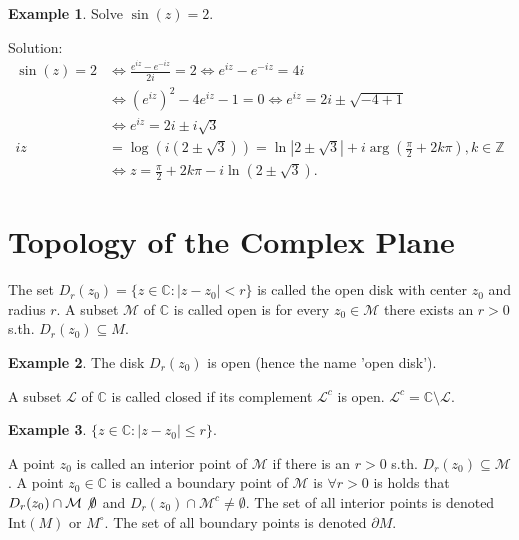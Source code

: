 \documentclass[12pt, a4paper]{article}
\theoremstyle{plain}
\theoremstyle{definition}
\newtheorem{example}{Example} %
\begin{document}
			\begin{example}
				Solve $\sin(z) = 2$.

				Solution:
				\begin{align*}
					\sin(z) = 2 &\iff \frac{e^{iz}-e^{-iz}}{2i}=2 \iff e^{iz}-e^{-iz} = 4i\\ &\iff
					(e^{iz})^2-4e^{iz}-1=0\iff e^{iz} = 2i\pm\sqrt{-4+1}\\ &\iff
					e^{iz} = 2i\pm i\sqrt{3}\\
					iz &= \log(i(2\pm\sqrt{3})) = \ln|2\pm\sqrt{3}|+i\arg(\frac{\pi}{2}+2k\pi),k\in \mathbb{Z}\\ &\iff
					z = \frac{\pi}{2} + 2k\pi - i\ln(2\pm\sqrt{3}).
				\end{align*}
			\end{example}
	\section{Topology of the Complex Plane} %
	\label{sec:topology_of_the_complex_plane}
		The set $D_r(z_0)= \{z\in \mathbb{C}: |z-z_0|<r\}$ is called the open disk with center $z_0$ and radius $r$. A subset $\mathcal{M}$ of $\mathbb{C}$ is called open is for every $z_0\in \mathcal{M}$ there exists an $r>0$ s.th. $D_r(z_0)\subseteq M$.

		\begin{example}
			The disk $D_r(z_0)$ is open (hence the name 'open disk').
		\end{example}

		A subset $\mathcal{L}$ of $\mathbb{C}$ is called closed if its complement $\mathcal{L}^c$ is open. $\mathcal{L}^c = \mathbb{C}\setminus\mathcal{L}$.

		\begin{example}
			$\{z\in \mathbb{C}: |z-z_0|\le r\}$. \\
		\end{example}

		A point $z_0$ is called an interior point of $\mathcal{M}$ if there is an $r>0$ s.th. $D_r(z_0)\subseteq\mathcal{M}$. A point $z_0\in \mathbb{C}$ is called a boundary point of $\mathcal{M}$ is $\forall r>0$ is holds that $D_r(z_0)\cap \mathcal{M}\not\emptyset$ and $D_r(z_0)\cap \mathcal{M}^c\not=\emptyset$. The set of all interior points is denoted $\mathrm{Int}(M)$ or $M^\circ$. The set of all boundary points is denoted $\partial M$.
\end{document}
